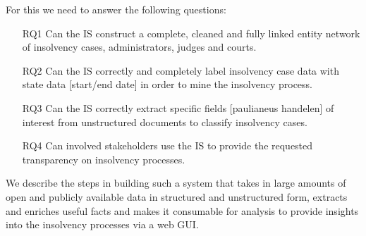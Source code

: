 For this we need to answer the following questions:
\begin{itemize}
	\item [RQ1] Can the IS construct a complete, cleaned and fully linked entity network of insolvency cases, administrators, judges and courts.
	\item [RQ2] Can the IS correctly and completely label insolvency case data with state data [start/end date] in order to mine the insolvency process.
	\item [RQ3] Can the IS correctly extract specific fields [paulianeus handelen] of interest from unstructured documents to classify insolvency cases.
	\item [RQ4] Can involved stakeholders use the IS to provide the requested transparency on insolvency processes.
\end{itemize}

We describe the steps in building such a system that takes in large amounts of open and publicly available data in structured and unstructured form, extracts and enriches useful facts and makes it consumable for analysis to provide insights into the insolvency processes via a web GUI.
